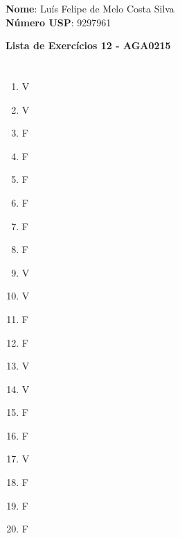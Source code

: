 \documentclass[12pt,letterpaper]{article}
\begin{document}
	
	\large \textbf{Nome}: Luís Felipe de Melo Costa Silva \\
	\textbf{Número USP}: 9297961 
    
	\begin{center}
		\LARGE \bf
		Lista de Exercícios 12 - AGA0215
	\end{center}
	
	\part{}
	
	\begin{multicols}{5}
		\begin{enumerate}
			\item V
			\item V
			\item F
			\item F
			\item F
			\item F
			\item F
			\item F
			\item V
			\item V
			\item F
			\item F
			\item V
			\item V
			\item F
			\item F
			\item V
			\item F
			\item F
			\item F
		\end{enumerate}
	\end{multicols}
	
\end{document}
